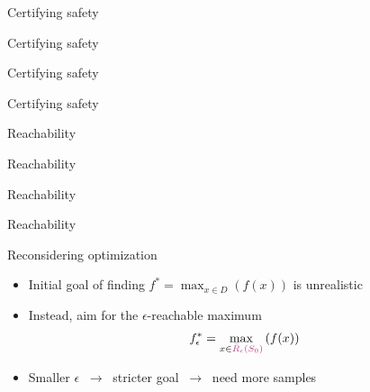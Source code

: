 \documentclass[xetex,10pt,mathserif,handout]{beamer}
\newlength\figureheight
\newlength\figurewidth
\newcommand{\Rbeps}{\bar{R}_{\epsilon}}
\newcommand{\ccrbeps}{{\color{magenta!70!black}\Rbeps(S_0)}\xspace}
\begin{document}
\begin{frame}{Certifying safety}
\centering
\setlength\figurewidth{5in}
\setlength\figureheight{3.5in}

\end{frame}

\begin{frame}{Certifying safety}
\centering
\setlength\figurewidth{5in}
\setlength\figureheight{3.5in}

\end{frame}

\begin{frame}{Certifying safety}
\centering
\setlength\figurewidth{5in}
\setlength\figureheight{3.5in}

\end{frame}

\begin{frame}{Certifying safety}
\centering
\setlength\figurewidth{5in}
\setlength\figureheight{3.5in}

\end{frame}

\begin{frame}{Reachability}
\centering
\setlength\figurewidth{5in}
\setlength\figureheight{3.5in}

\end{frame}

\begin{frame}{Reachability}
\centering
\setlength\figurewidth{5in}
\setlength\figureheight{3.5in}

\end{frame}

\begin{frame}{Reachability}
\centering
\setlength\figurewidth{5in}
\setlength\figureheight{3.5in}

\end{frame}

\begin{frame}{Reachability}
\centering
\setlength\figurewidth{5in}
\setlength\figureheight{3.5in}

\end{frame}

\begin{frame}{Reconsidering optimization}
\begin{itemize}
\item<1-> Initial goal of finding $f^* = \max_{x \in D}\left(f(x)\right)$ is unrealistic
\vspace{2em}
\item<2-> Instead, aim for the $\epsilon$-reachable maximum
\begin{align*}
  f_{\epsilon}^* = \max_{x \in \ccrbeps}\left(f(x)\right)
\end{align*}
\item<3-> Smaller $\epsilon$ $\ \rightarrow\ $ stricter goal $\ \rightarrow\ $ need more samples
\end{itemize}
\end{frame}
\end{document}

